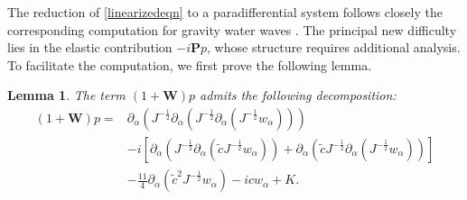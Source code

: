 \documentclass[10pt]{amsart}
\newtheorem{lemma}[theorem]{Lemma}
\theoremstyle{remark}
\theoremstyle{definition}
\numberwithin{equation}{section}
\newcommand{\p}{\partial}
\newcommand{\al}{\alpha}
\newcommand{\f}{\frac}
\newcommand{\nP}{{\mathbf P}}
\begin{document}
The reduction of \eqref{linearizedeqn} to a paradifferential system follows closely the corresponding computation for gravity water waves \cite{AIT}.
The principal new difficulty lies in the elastic contribution $-i\nP p$, whose structure requires additional analysis.
To facilitate the computation, we first prove the following lemma.
\begin{lemma}
The term $(1+\mathbf{W})p$ admits the following decomposition:
\begin{equation} \label{pexpansion}
\begin{split}
(1+\mathbf{W})p=&\p_{\al}(J^{-\f12}\p_{\al}(J^{-\f12}\p_{\al}(J^{-\f12}w_{\al})))\\
&-i\left[\p_{\al}\left(J^{-\f12}\p_{\al}\left(\tilde{c}J^{-\f12}w_{\al}\right)\right)
+\p_{\al}\left(\tilde{c}J^{-\f12}\p_{\al}\left(J^{-\f12}w_{\al}\right)\right)\right]\\
&-\f{11}4\p_{\al}\left(\tilde{c}^2J^{-\f12}w_{\al}\right)
-icw_{\al} + K.
\end{split}    
\end{equation}
\end{lemma}
\end{document}
